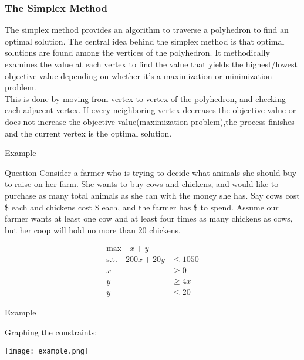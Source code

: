 \documentclass[9pt]{beamer}
\begin{document}
\begin{frame}
\frametitle{The Simplex Method}
The simplex method provides an algorithm to traverse a polyhedron to find an optimal solution. The central idea behind the simplex method is that optimal solutions are found among the vertices of the polyhedron. It methodically examines the value at each vertex to find the value that yields the highest/lowest objective value depending on whether it's a maximization or minimization problem.\\
\vspace{0.1cm}
\pause
This is done by moving from vertex to vertex of the polyhedron, and checking each adjacent vertex. If every neighboring vertex decreases the objective value or does not increase the objective value(maximization problem),the process finishes and the current vertex is the optimal solution.  
\end{frame}

\begin{frame}{Example}
\begin{block}{Question}
Consider a farmer who is trying to decide what animals she should buy to raise on her farm. She wants to buy cows and chickens, and would like to purchase as many total animals as she can with the money she has. Say cows cost \$  each and chickens cost \$ each, and the farmer has \$ to spend. Assume our farmer wants at least one cow and at least four times as many chickens as cows, but her coop will hold no more than 20 chickens.
\end{block}

\begin{align*}
    \text{max} \quad
x+y& \\ \text{s.t.} \quad 200x + 20y &\leq 1050 \\
x &\geq 0\\
y &\geq 4x\\
y &\leq 20
\end{align*}
\end{frame} 

\begin{frame}{Example}
\vspace{0.2cm}
\begin{flushleft}
Graphing the constraints;
\end{flushleft}
\vspace{0.2cm}
\centering
\texttt{[image: example.png]}
\end{frame}
\end{document}
